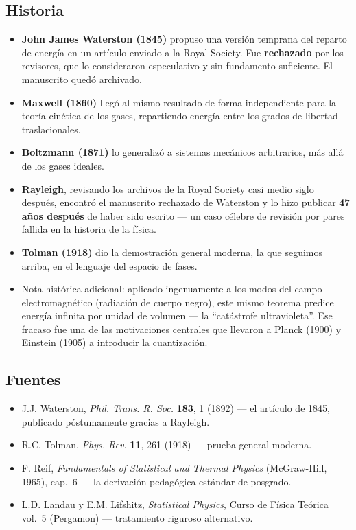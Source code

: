 \documentclass[11pt,a4paper]{article}
\newcommand{\clave}[1]{\textcolor{red!55!black}{\textbf{#1}}}
\begin{document}
\subsection{Historia}

\begin{itemize}[leftmargin=1.4em]
\item \textbf{John James Waterston (1845)} propuso una versión temprana del
reparto de energía en un artículo enviado a la Royal Society. Fue
\clave{rechazado} por los revisores, que lo consideraron especulativo y sin
fundamento suficiente. El manuscrito quedó archivado.
\item \textbf{Maxwell (1860)} llegó al mismo resultado de forma
independiente para la teoría cinética de los gases, repartiendo energía
entre los grados de libertad traslacionales.
\item \textbf{Boltzmann (1871)} lo generalizó a sistemas mecánicos
arbitrarios, más allá de los gases ideales.
\item \textbf{Rayleigh}, revisando los archivos de la Royal Society casi
medio siglo después, encontró el manuscrito rechazado de Waterston y lo
hizo publicar \textbf{47 años después} de haber sido escrito --- un caso
célebre de revisión por pares fallida en la historia de la física.
\item \textbf{Tolman (1918)} dio la demostración general moderna, la que
seguimos arriba, en el lenguaje del espacio de fases.
\item Nota histórica adicional: aplicado ingenuamente a los modos del
campo electromagnético (radiación de cuerpo negro), este mismo teorema
predice energía infinita por unidad de volumen --- la ``catástrofe
ultravioleta''. Ese fracaso fue una de las motivaciones centrales que
llevaron a Planck (1900) y Einstein (1905) a introducir la cuantización.
\end{itemize}

\subsection{Fuentes}
\begin{itemize}[leftmargin=1.4em]
\item J.J. Waterston, \textit{Phil. Trans. R. Soc.} \textbf{183}, 1 (1892)
--- el artículo de 1845, publicado póstumamente gracias a Rayleigh.
\item R.C. Tolman, \textit{Phys. Rev.} \textbf{11}, 261 (1918) --- prueba
general moderna.
\item F. Reif, \textit{Fundamentals of Statistical and Thermal Physics}
(McGraw-Hill, 1965), cap.~6 --- la derivación pedagógica estándar de
posgrado.
\item L.D. Landau y E.M. Lifshitz, \textit{Statistical Physics}, Curso de
Física Teórica vol.~5 (Pergamon) --- tratamiento riguroso alternativo.
\end{itemize}
\end{document}
